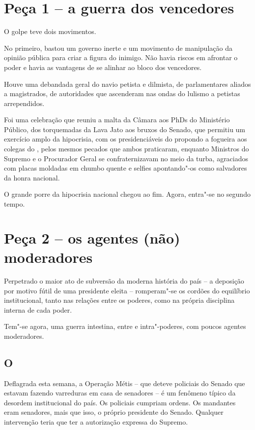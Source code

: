  

\section{Peça 1 -- a guerra dos vencedores}

O golpe teve dois movimentos.

No primeiro, bastou um governo inerte e um movimento de manipulação da
opinião pública para criar a figura do inimigo. Não havia riscos em
afrontar o poder e havia as vantagens de se alinhar ao bloco dos
vencedores.

Houve uma debandada geral do navio petista e dilmista, de parlamentares
aliados a magistrados, de autoridades que ascenderam nas ondas do
lulismo a petistas arrependidos.

Foi uma celebração que reuniu a malta da Câmara aos PhDs do Ministério
Público, dos torquemadas da Lava Jato aos bruxos do Senado, que permitiu
um exercício amplo da hipocrisia, com os presidenciáveis do 
propondo a fogueira aos colegas do , pelos mesmos pecados que ambos
praticaram, enquanto Ministros do Supremo e o Procurador Geral se
confraternizavam no meio da turba, agraciados com placas moldadas em
chumbo quente e selfies apontando"-os como salvadores da honra nacional.

O grande porre da hipocrisia nacional chegou ao fim. Agora, entra"-se no
segundo tempo.

\section{Peça 2 -- os agentes (não) moderadores}

Perpetrado o maior ato de subversão da moderna história do país -- a
deposição por motivo fútil de uma presidente eleita -- romperam"-se os
cordões do equilíbrio institucional, tanto nas relações entre os
poderes, como na própria disciplina interna de cada poder.

Tem"-se agora, uma guerra intestina, entre e intra"-poderes, com poucos
agentes moderadores.

\subsection{O }

Deflagrada esta semana, a Operação Métis -- que deteve policiais do
Senado que estavam fazendo varreduras em casa de senadores -- é um
fenômeno típico da desordem institucional do país. Os policiais cumpriam
ordens. Os mandantes eram senadores, mais que isso, o próprio presidente
do Senado. Qualquer intervenção teria que ter a autorização expressa do
Supremo.

